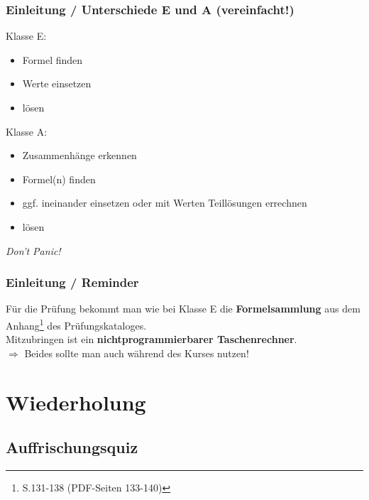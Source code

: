 \begin{frame}
    \frametitle{Einleitung / Unterschiede E und A (vereinfacht!)}

    \vspace{1em}
    Klasse E:

    \begin{itemize}
        \item Formel finden
        \item Werte einsetzen
        \item lösen
    \end{itemize}

    \pause

    Klasse A:
    
    \begin{itemize}
        \item Zusammenhänge erkennen
        \item Formel(n) finden
        \item ggf. ineinander einsetzen oder mit Werten Teillösungen errechnen
        \item lösen
    \end{itemize}

    \pause

    \begin{center}\Large \emph{Don't Panic!}\end{center}

\end{frame}

\begin{frame}
    \frametitle{Einleitung / Reminder}

    Für die Prüfung bekommt man wie bei Klasse E die
    \textbf{Formelsammlung}\hyperlink{refs}{\cite{mat}} aus dem
    Anhang\footnote{S.131-138 (PDF-Seiten 133-140)} des Prüfungskataloges.\\[1em]
    
    Mitzubringen ist ein \textbf{nichtprogrammierbarer Taschenrechner}. \\[3em]

    $\Rightarrow$ Beides sollte man auch während des Kurses nutzen!

\end{frame}

\section{Wiederholung}

\subsection{Auffrischungsquiz}


